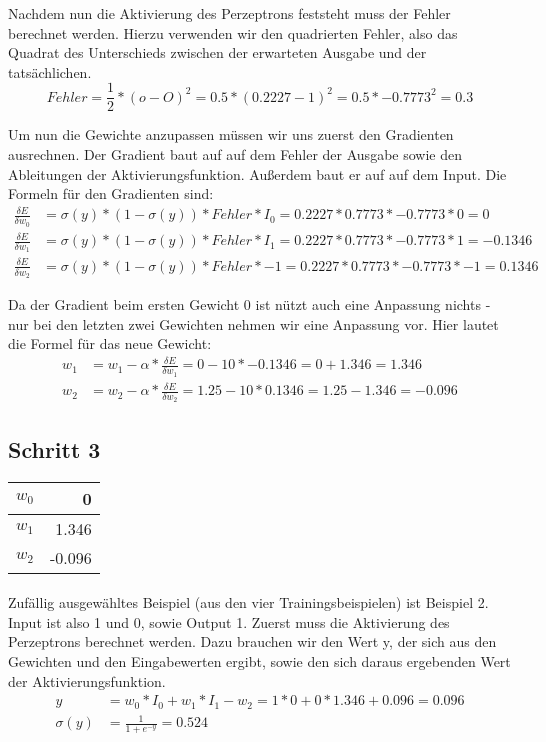 \documentclass[a4paper]{article}
\begin{document}
Nachdem nun die Aktivierung des Perzeptrons feststeht muss der Fehler berechnet werden. Hierzu verwenden wir den quadrierten Fehler, also das Quadrat des Unterschieds zwischen der erwarteten Ausgabe und der tatsächlichen.
\[
	Fehler = \frac{1}{2} * (o - O)^2 = 0.5 * (0.2227 - 1)^2 = 0.5 * -0.7773^2 = 0.3
\]

Um nun die Gewichte anzupassen müssen wir uns zuerst den Gradienten ausrechnen.
Der Gradient baut auf auf dem Fehler der Ausgabe sowie den Ableitungen der Aktivierungsfunktion. Außerdem baut er auf auf dem Input. Die Formeln für den Gradienten sind:
\begin{align*}
	\frac{\delta E}{\delta w_0} &= \sigma(y) * (1 - \sigma(y)) * Fehler * I_0 = 0.2227 * 0.7773 * -0.7773 * 0 = 0 \\
	\frac{\delta E}{\delta w_1} &= \sigma(y) * (1 - \sigma(y)) * Fehler * I_1 = 0.2227 * 0.7773 * -0.7773 * 1 = -0.1346 \\
	\frac{\delta E}{\delta w_2} &= \sigma(y) * (1 - \sigma(y)) * Fehler * -1 = 0.2227 * 0.7773 * -0.7773 * -1 = 0.1346
\end{align*}

Da der Gradient beim ersten Gewicht 0 ist nützt auch eine Anpassung nichts - nur bei den letzten zwei Gewichten nehmen wir eine Anpassung vor. Hier lautet die Formel für das neue Gewicht:
\begin{align*}
	w_1 &= w_1 - \alpha * \frac{\delta E}{\delta w_1} = 0 - 10 * -0.1346 = 0 + 1.346 = 1.346 \\
	w_2 &= w_2 - \alpha * \frac{\delta E}{\delta w_2} = 1.25 - 10 * 0.1346 = 1.25 - 1.346 = -0.096
\end{align*}

\subsection{Schritt 3}
\begin{tabular}{|l|r|}
	\hline
	$w_0$ & 0 \\\hline
	$w_1$ & 1.346 \\\hline
	$w_2$ & -0.096 \\\hline
\end{tabular}
\paragraph{}
Zufällig ausgewähltes Beispiel (aus den vier Trainingsbeispielen) ist Beispiel 2. Input ist also 1 und 0, sowie Output 1.
Zuerst muss die Aktivierung des Perzeptrons berechnet werden. Dazu brauchen wir den Wert y, der sich aus den Gewichten und den Eingabewerten ergibt, sowie den sich daraus ergebenden Wert der Aktivierungsfunktion.
\begin{align*}
	y &= w_0 * I_0 + w_1 * I_1 - w_2 = 1 * 0 + 0 * 1.346 + 0.096 = 0.096 \\
	\sigma(y) &= \frac{1}{1 + e^{-y}} = 0.524
\end{align*}
\end{document}
